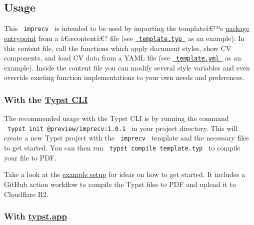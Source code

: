 
\subsection{Usage}\label{usage}

This \texttt{\ imprecv\ } is intended to be used by importing the
templateâ€™s
\href{https://github.com/typst/packages/raw/main/packages/preview/imprecv/1.0.1/cv.typ}{package
entrypoint} from a â€œcontentâ€? file (see
\href{https://github.com/typst/packages/raw/main/packages/preview/imprecv/1.0.1/template/template.typ}{\texttt{\ template.typ\ }}
as an example). In this content file, call the functions which apply
document styles, show CV components, and load CV data from a YAML file
(see
\href{https://github.com/typst/packages/raw/main/packages/preview/imprecv/1.0.1/template/template.yml}{\texttt{\ template.yml\ }}
as an example). Inside the content file you can modify several style
variables and even override existing function implementations to your
own needs and preferences.

\subsubsection{\texorpdfstring{With the
\href{https://github.com/typst/typst}{Typst
CLI}}{With the Typst CLI}}\label{with-the-typst-cli}

The recommended usage with the Typst CLI is by running the command
\texttt{\ typst\ init\ @preview/imprecv:1.0.1\ } in your project
directory. This will create a new Typst project with the
\texttt{\ imprecv\ } template and the necessary files to get started.
You can then run \texttt{\ typst\ compile\ template.typ\ } to compile
your file to PDF.

Take a look at the
\href{https://github.com/jskherman/cv.typ-example-repo}{example setup}
for ideas on how to get started. It includes a GitHub action workflow to
compile the Typst files to PDF and upload it to Cloudflare R2.

\subsubsection{\texorpdfstring{With
\href{https://typst.app/}{typst.app}}{With typst.app}}\label{with-typst.app}


